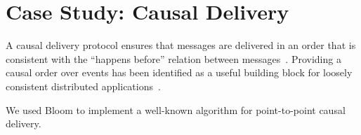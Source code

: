 \section{Case Study: Causal Delivery}
\label{sec:causal}
A causal delivery protocol ensures that messages are delivered in an order that
is consistent with the ``happens before'' relation between
messages~\cite{Lamport1978}. Providing a causal order over events has been
identified as a useful building block for loosely consistent distributed
applications~\cite{Lloyd2011}.

We used Bloom to implement a well-known algorithm for point-to-point causal
delivery\cite{Schiper1989}.
